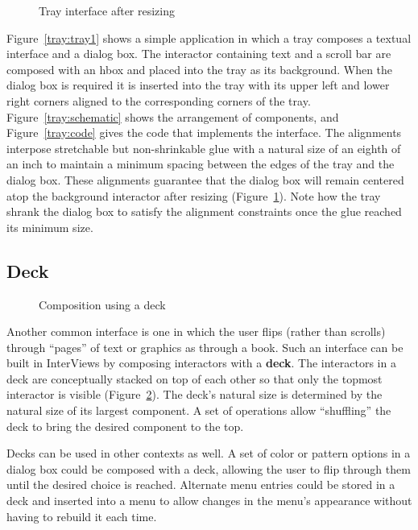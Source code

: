 \begin{figure}
\vspace{1.75in}
\caption{Tray interface after resizing}
\label{tray:tray2}
\end{figure}

Figure~\ref{tray:tray1} shows a simple application in which a tray
composes a textual interface and a dialog box.  The interactor
containing text and a scroll bar are composed with an hbox and placed
into the tray as its background.  When the dialog box is required it
is inserted into the tray with its upper left and lower right corners
aligned to the corresponding corners of the tray.
Figure~\ref{tray:schematic} shows the arrangement of components, and
Figure~\ref{tray:code} gives the code that implements the interface.
The alignments interpose stretchable but
non-shrinkable glue with a natural size of an eighth of an inch to
maintain a minimum spacing between the edges of the tray and the
dialog box.  These alignments guarantee that the dialog box will
remain centered atop the background interactor after resizing
(Figure~\ref{tray:tray2}).  Note how the tray shrank the dialog box to
satisfy the alignment constraints once the glue reached its minimum
size.

    \subsection{Deck}

\begin{figure}
\vspace{2in}
\caption{Composition using a deck}
\label{deck:schematic}
\end{figure}

Another common interface is one in which the user flips (rather than
scrolls) through ``pages'' of text or graphics as through a book.
Such an interface can be built in InterViews by composing interactors
with a {\bf deck}.  The interactors in a deck are conceptually stacked
on top of each other so that only the topmost interactor is visible
(Figure~\ref{deck:schematic}).  The deck's natural size is determined
by the natural size of its largest component.  A set of operations
allow ``shuffling'' the deck to bring the desired component to the
top.

Decks can be used in other contexts as well.  A set of
color or pattern options in a dialog box could be composed with a
deck, allowing the user to flip through them until the desired choice
is reached.  Alternate menu entries could be stored in a deck and
inserted into a menu to allow changes in the menu's appearance without
having to rebuild it each time.

